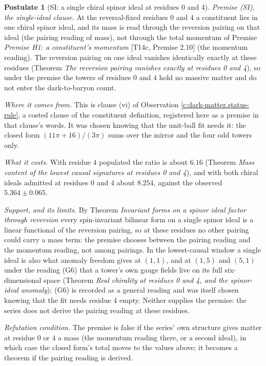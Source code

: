 \documentclass[11pt]{article}
\theoremstyle{definition}
\newtheorem{postulate}[theorem]{Postulate}
\theoremstyle{plain}
\begin{document}
\begin{postulate}[SI: a single chiral spinor ideal at residues 0 and 4]\label{c:dark-matter.single-ideal-at-residues-zero-and-four}
\emph{Premise (SI), the single-ideal clause.} At the reversal-fixed residues $0$ and $4$ a constituent lies in one chiral spinor ideal, and its mass is read through the reversion pairing on that ideal (the pairing reading of mass), not through the total momentum of Premise \emph{Premise H1: a constituent's momentum} [T14c, Premise 2.10] (the momentum reading). The reversion pairing on one ideal vanishes identically exactly at these residues (Theorem \emph{The reversion pairing vanishes exactly at residues 0 and 4}), so under the premise the towers of residues $0$ and $4$ hold no massive matter and do not enter the dark-to-baryon count.

\emph{Where it comes from.} This is clause (vi) of Observation \ref{c:dark-matter.status-rule}, a costed clause of the constituent definition, registered here as a premise in that clause's words. It was chosen knowing that the unit-ball fit needs it: the closed form $(11\pi + 16)/(3\pi)$ sums over the mirror and the four odd towers only.

\emph{What it costs.} With residue $4$ populated the ratio is about $6.16$ (Theorem \emph{Mass content of the lowest causal signatures at residues 0 and 4}), and with both chiral ideals admitted at residues $0$ and $4$ about $8.254$, against the observed $5.364 \pm 0.065$.

\emph{Support, and its limits.} By Theorem \emph{Invariant forms on a spinor ideal factor through reversion} every spin-invariant bilinear form on a single spinor ideal is a linear functional of the reversion pairing, so at these residues no other pairing could carry a mass term: the premise chooses between the pairing reading and the momentum reading, not among pairings. In the lowest-causal window a single ideal is also what anomaly freedom gives at $(1,1)$, and at $(1,5)$ and $(5,1)$ under the reading (G6) that a tower's own gauge fields live on its full six-dimensional space (Theorem \emph{Real chirality at residues 0 and 4, and the spinor-ideal anomaly}); (G6) is recorded as a general reading and was itself chosen knowing that the fit needs residue $4$ empty. Neither supplies the premise: the series does not derive the pairing reading at these residues.

\emph{Refutation condition.} The premise is false if the series' own structure gives matter at residue $0$ or $4$ a mass (the momentum reading there, or a second ideal), in which case the closed form's total moves to the values above; it becomes a theorem if the pairing reading is derived.
\end{postulate}
\end{document}
